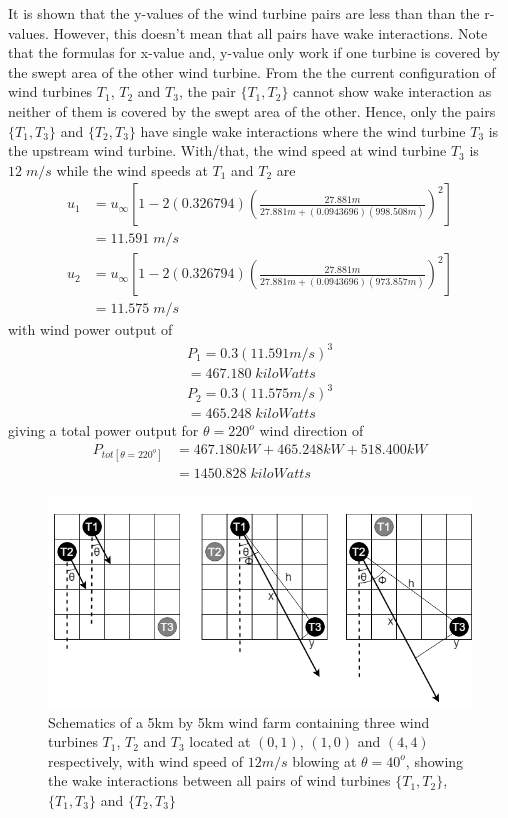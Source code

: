 It is shown that the y-values of the wind turbine pairs are less than than the r-values. However, this doesn't mean that all pairs have wake interactions. Note that the formulas for x-value and, y-value only work if one turbine is covered by the swept area of the other wind turbine. From the the current configuration of wind turbines $T_1$, $T_2$ and $T_3$, the pair $\{T_1,T_2\}$ cannot show wake interaction as neither of them is covered by the swept area of the other. Hence, only the pairs $\{T_1,T_3\}$ and $\{T_2,T_3\}$ have single wake interactions where the wind turbine $T_3$ is the upstream wind turbine. With/that, the wind speed at wind turbine $T_3$ is $12\;m/s$ while the wind speeds at $T_1$ and $T_2$ are
	\begin{align*}
        u_{1} &= u_\infty \left[ 1-2(0.326794)\left( \frac{27.881m}{27.881m+(0.0943696) (998.508m)} \right)^2 \right] \\
        &=11.591\;m/s
    \end{align*}
    \begin{align*}
        u_{2} &= u_\infty \left[ 1-2(0.326794)\left( \frac{27.881m}{27.881m+(0.0943696) (973.857m)} \right)^2 \right] \\
        &=11.575\;m/s
    \end{align*}
with wind power output of
	\begin{align*}
		P_1=0.3(11.591m/s)^3 \\
		=467.180\;kiloWatts
	\end{align*}
	\begin{align*}
		P_2=0.3(11.575m/s)^3 \\
		=465.248\;kiloWatts
	\end{align*}
giving a total power output for $\theta=220^o$ wind direction of
	\begin{align*}
		P_{tot[\theta=220^o]} &= 467.180kW + 465.248kW + 518.400kW \\
		&=1450.828\;kiloWatts
	\end{align*}
    
    \begin{figure}
        \centering
        \includegraphics[width=\linewidth]{Figures/011044-40.png}
        \caption{Schematics of a 5km by 5km wind farm containing three wind turbines $T_1$, $T_2$ and $T_3$ located at $(0,1)$, $(1,0)$ and $(4,4)$ respectively, with wind speed of $12m/s$ blowing at $\theta=40^o$, showing the wake interactions between all pairs of wind turbines $\{T_1,T_2\}$, $\{T_1,T_3\}$ and $\{T_2,T_3\}$ }
        \label{011044-40}
    \end{figure}
    
